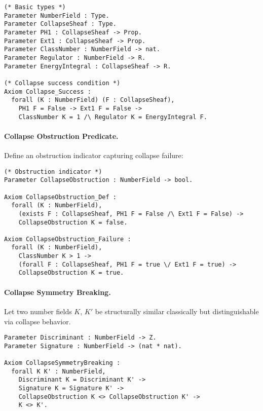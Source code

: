 \documentclass[11pt]{article}
\begin{document}
{\begin{lstlisting}[language=Coq]
(* Basic types *)
Parameter NumberField : Type.
Parameter CollapseSheaf : Type.
Parameter PH1 : CollapseSheaf -> Prop.
Parameter Ext1 : CollapseSheaf -> Prop.
Parameter ClassNumber : NumberField -> nat.
Parameter Regulator : NumberField -> R.
Parameter EnergyIntegral : CollapseSheaf -> R.

(* Collapse success condition *)
Axiom Collapse_Success :
  forall (K : NumberField) (F : CollapseSheaf),
    PH1 F = False -> Ext1 F = False ->
    ClassNumber K = 1 /\ Regulator K = EnergyIntegral F.
\end{lstlisting}

\paragraph{Collapse Obstruction Predicate.}

Define an obstruction indicator capturing collapse failure:

\begin{lstlisting}[language=Coq]
(* Obstruction indicator *)
Parameter CollapseObstruction : NumberField -> bool.

Axiom CollapseObstruction_Def :
  forall (K : NumberField),
    (exists F : CollapseSheaf, PH1 F = False /\ Ext1 F = False) ->
    CollapseObstruction K = false.

Axiom CollapseObstruction_Failure :
  forall (K : NumberField),
    ClassNumber K > 1 ->
    (forall F : CollapseSheaf, PH1 F = true \/ Ext1 F = true) ->
    CollapseObstruction K = true.
\end{lstlisting}

\paragraph{Collapse Symmetry Breaking.}

Let two number fields \( K \), \( K' \) be structurally similar classically but distinguishable via collapse behavior.

\begin{lstlisting}[language=Coq]
Parameter Discriminant : NumberField -> Z.
Parameter Signature : NumberField -> (nat * nat).

Axiom CollapseSymmetryBreaking :
  forall K K' : NumberField,
    Discriminant K = Discriminant K' ->
    Signature K = Signature K' ->
    CollapseObstruction K <> CollapseObstruction K' ->
    K <> K'.
\end{lstlisting}

}
\end{document}
